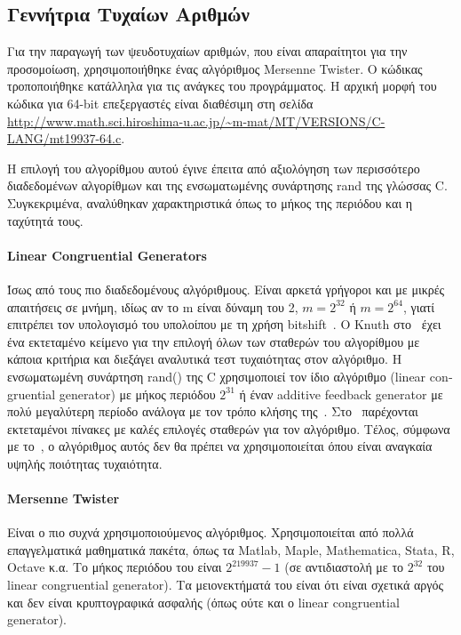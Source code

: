 \documentclass[12pt]{report}
\begin{document}
\subsection{Γεννήτρια Τυχαίων Αριθμών}
Για την παραγωγή των ψευδοτυχαίων αριθμών, που είναι απαραίτητοι για την προσομοίωση, χρησιμοποιήθηκε ένας αλγόριθμος \textlatin{Mersenne Twister}. Ο κώδικας τροποποιήθηκε κατάλληλα για τις ανάγκες του προγράμματος. Η αρχική μορφή του κώδικα για 64-\textlatin{bit} επεξεργαστές είναι διαθέσιμη στη σελίδα \textlatin{\url{http://www.math.sci.hiroshima-u.ac.jp/~m-mat/MT/VERSIONS/C-LANG/mt19937-64.c}}.

Η επιλογή του αλγορίθμου αυτού έγινε έπειτα από αξιολόγηση των περισσότερο διαδεδομένων αλγορίθμων και της ενσωματωμένης συνάρτησης \textlatin{rand} της γλώσσας \textlatin{C}. Συγκεκριμένα, αναλύθηκαν χαρακτηριστικά όπως το μήκος της περιόδου και η ταχύτητά τους.

\paragraph{\textlatin{Linear Congruential Generators}} Ίσως από τους πιο διαδεδομένους αλγόριθμους. Είναι αρκετά γρήγοροι και με μικρές απαιτήσεις σε μνήμη, ιδίως αν το \textlatin{m} είναι δύναμη του 2, \(m=2^{32}\) ή \(m=2^{64}\), γιατί επιτρέπει τον υπολογισμό του υπολοίπου με τη χρήση \textlatin{bitshift}~\cite{wiki:01}. O \textlatin{Knuth} στο~\cite{book:06} έχει ένα εκτεταμένο κείμενο για την επιλογή όλων των σταθερών του αλγορίθμου με κάποια κριτήρια και διεξάγει αναλυτικά τεστ τυχαιότητας στον αλγόριθμο. Η ενσωματωμένη συνάρτηση \textlatin{rand()} της \textlatin{C} χρησιμοποιεί τον ίδιο αλγόριθμο (\textlatin{linear congruential generator}) με μήκος περιόδου \(2^{31}\) ή έναν \textlatin{additive feedback generator} με πολύ μεγαλύτερη περίοδο ανάλογα με τον τρόπο κλήσης της~\cite{wiki:01}. Στο~\cite{paper:11} παρέχονται εκτεταμένοι πίνακες με καλές επιλογές σταθερών για τον αλγόριθμο. Τέλος, σύμφωνα με το~\cite{wiki:01}, ο αλγόριθμος αυτός δεν θα πρέπει να χρησιμοποιείται όπου είναι αναγκαία υψηλής ποιότητας τυχαιότητα.

\paragraph{\textlatin{Mersenne Twister}}
Είναι ο πιο συχνά χρησιμοποιούμενος αλγόριθμος. Χρησιμοποιείται από πολλά επαγγελματικά μαθηματικά πακέτα, όπως τα \textlatin{Matlab, Maple, Mathematica, Stata, R, Octave} κ.α. Το μήκος περιόδου του είναι \(2^{219937}-1\) (σε αντιδιαστολή με το \(2^{32}\) του \textlatin{linear congruential generator}). Τα μειονεκτήματά του είναι ότι είναι σχετικά αργός και δεν είναι κρυπτογραφικά ασφαλής (όπως ούτε και ο \textlatin{linear congruential generator}).
\end{document}
